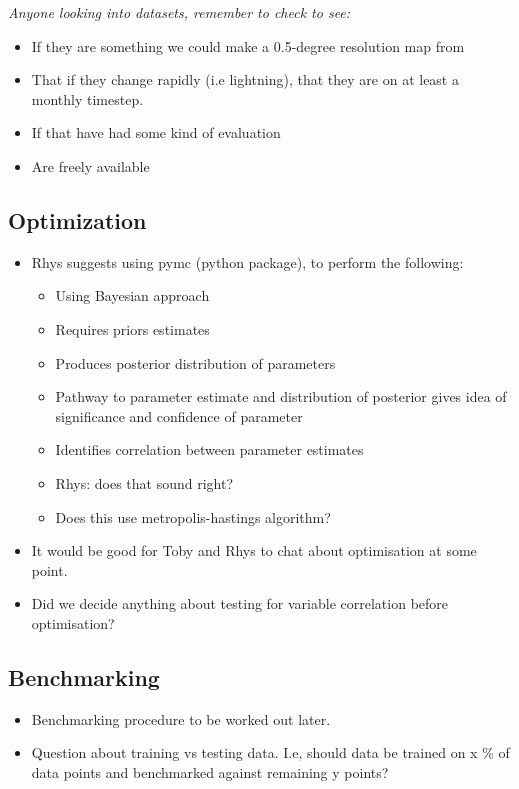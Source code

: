 \textit{Anyone looking into datasets, remember to check to see:}

\begin{itemize}
\itemsep1pt\parskip0pt
\item
  If they are something we could make a 0.5-degree resolution map from
\item
  That if they change rapidly (i.e lightning), that they are on at least a monthly timestep.
\item
  If that have had some kind of evaluation
\item
  Are freely available
\end{itemize}

\subsection{Optimization}

\begin{itemize}
\itemsep1pt\parskip0pt
\item
  Rhys suggests using pymc (python package), to perform the following:

\begin{itemize}
\itemsep1pt\parskip0pt
\item
  Using Bayesian approach
\item
  Requires priors estimates
\item
  Produces posterior distribution of parameters
\item
  Pathway to parameter estimate and distribution of posterior gives idea of significance and confidence of parameter
\item
  Identifies correlation between parameter estimates
\item
  Rhys: does that sound right?
\item
  Does this use metropolis-hastings algorithm?
\end{itemize}
\end{itemize}



\begin{itemize}
\itemsep1pt\parskip0pt
\item
  It would be good for Toby and Rhys to chat about optimisation at some point.
\item
  Did we decide anything about testing for variable correlation before optimisation?
\end{itemize}

\subsection{Benchmarking}

\begin{itemize}
\itemsep1pt\parskip0pt
\item
  Benchmarking procedure to be worked out later.
\item
  Question about training vs testing data. I.e, should data be trained on x \% of data points and benchmarked against remaining y points?
\end{itemize}
                    
